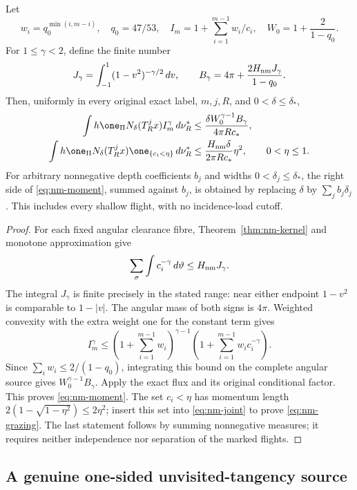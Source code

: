 \begin{corollary}
\label{cor:nm-moments}
Let
\[
 w_i=q_0^{\min(i,m-i)},\quad q_0=47/53,\quad
 I_m=1+\sum_{i=1}^{m-1} w_i/c_i,\quad
 W_0=1+\frac{2}{1-q_0}.
\]
For $1\le\gamma<2$, define the finite number
\[
 J_\gamma=\int_{-1}^1(1-v^2)^{-\gamma/2}\,dv,
 \qquad
 B_\gamma=4\pi+\frac{2H_{\rm nm}J_\gamma}{1-q_0}.
\]
Then, uniformly in every original exact label, $m,j,R$, and
$0<\delta\le\delta_*$,
\begin{align}
 \int h\one_\Pi N_\delta(T_R^jx)I_m^\gamma\,d\nu_R^*
  &\le\frac{\delta W_0^{\gamma-1}B_\gamma}{4\pi R c_*},
                                             \label{eq:nm-moment}\\
 \int h\one_\Pi N_\delta(T_R^jx)
                         \one_{\{c_i<\eta\}}\,d\nu_R^*
  &\le\frac{H_{\rm nm}\delta}{2\pi R c_*}\eta^2,
       \qquad 0<\eta\le1.                  \label{eq:nm-grazing}
\end{align}
For arbitrary nonnegative depth coefficients $b_j$ and widths
$0<\delta_j\le\delta_*$, the right side of
\eqref{eq:nm-moment}, summed against $b_j$, is obtained by
replacing $\delta$ by $\sum_j b_j\delta_j$.
This includes every shallow flight, with no incidence-load cutoff.
\end{corollary}
\begin{proof}
For each fixed angular clearance fibre, Theorem~\ref{thm:nm-kernel}
and monotone approximation give
\[
 \sum_\sigma\int c_i^{-\gamma}\,d\vartheta
                        \le H_{\rm nm}J_\gamma.
\]
The integral $J_\gamma$ is finite precisely in the stated range:
near either endpoint $1-v^2$ is comparable to $1-|v|$.
The angular mass of both signs is $4\pi$.  Weighted convexity
with the extra weight one for the constant term gives
\[
 I_m^\gamma\le
 \left(1+\sum_{i=1}^{m-1}w_i\right)^{\gamma-1}
                 \left(1+\sum_{i=1}^{m-1}w_ic_i^{-\gamma}\right).
\]
Since $\sum_iw_i\le2/(1-q_0)$, integrating this bound on the
complete angular source gives $W_0^{\gamma-1}B_\gamma$.
Apply the exact flux and its original conditional factor.  This
proves \eqref{eq:nm-moment}.  The set $c_i<\eta$ has momentum
length $2(1-\sqrt{1-\eta^2})\le2\eta^2$; insert this set into
\eqref{eq:nm-joint} to prove \eqref{eq:nm-grazing}.
The last statement follows by summing nonnegative measures; it
requires neither independence nor separation of the marked flights.
\end{proof}

\subsection{A genuine one-sided unvisited-tangency source}

